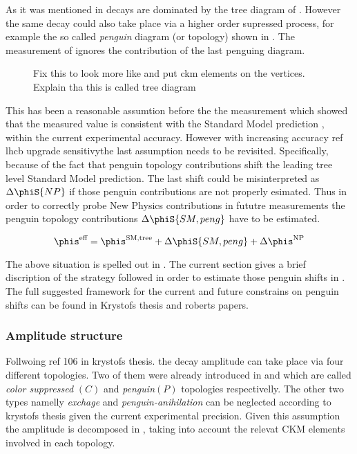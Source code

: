 As it was mentioned in  \BsJpsiPhi decays are dominated by the tree diagram of .
However the same decay could also take place via a higher order supressed process, for example the so called {\it penguin} diagram (or topology)
shown in . The \phis measurement of  ignores the contribution of the last penguing diagram.

\begin{figure}[h]
  \centering
  {\sffamily }
  \caption{{\color{red} Fix this to look more like  and put ckm elements on the vertices}. Explain tha this is called tree diagram}
  \label{bs2jpsiphi_peng}
\end{figure}

\noindent This has been a reasonable assumtion before the the \lhcb measurement which showed that the measured  value is consistent with the Standard
Model prediction , within the current experimental accuracy. However with increasing accuracy {\color{red} ref lhcb upgrade \phis sensitivy}the last assumption needs to be revisited.
Specifically, because of the fact that penguin topology contributions shift the leading tree level Standard Model prediction.
The last shift could be misinterpreted as $\Delta\phiS{NP}$ if those penguin contributions are not properly esimated.
Thus in order to correctly probe New Physics contributions in fututre measurements the penguin topology contributions $\Delta\phiS{SM,peng}$
have to be estimated.

\begin{equation}
\phis^{\text {eff}} = \phis^{\tiny \text{SM,tree}} + \Delta\phiS{SM,peng} + \Delta\phis^{\tiny \text{NP}}
 \label{phis_sm_peng}
\end{equation}

\noindent The above situation is spelled out in . The current section gives a brief discription
of the strategy followed in order to estimate those penguin shifts in \phis. The full suggested framework for the
current and future constrains on penguin shifts can be found in {\color{red} Krystofs thesis and roberts papers.}

\subsubsection{Amplitude structure}
Follwoing {\color{red} ref 106 in krystofs thesis.} the \BsJpsiPhi decay amplitude can take place via four different topologies.
Two of them were already introduced in  and  which are called {\it color suppressed }$(C)$ and {\it penguin}$(P)$
topologies respectivelly. The other two types namelly {\it exchage} and {\it penguin-anihilation} can be neglected according to {\color{red} krystofs thesis}
given the current experimental precision. Given this assumption the \BsJpsiPhi amplitude is decomposed in , taking into account the
relevat CKM elements involved in each topology.

